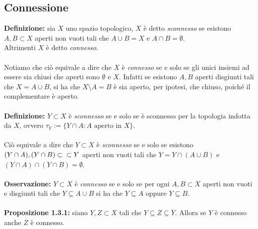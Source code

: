 \documentclass{article}
\begin{document}
\newpage
\subsection{Connessione}
\textbf{Definizione:} sia $X$ uno spazio topologico, $X$ è detto \textit{sconnesso} se esistono $A, B \subset X$ aperti non vuoti tali che $A \cup B = X$ e $A \cap B = \emptyset$. \\ Altrimenti $X$ è detto \textit{connesso}. \\ \\
Notiamo che ciò equivale a dire che $X$ è \textit{connesso} se e solo se gli unici insiemi ad essere sia chiusi che aperti sono $\emptyset$ e $X$. Infatti se esistono $A, B$ aperti disgiunti tali che $X = A \cup B$, si ha che $X \setminus A = B$ è sia aperto, per ipotesi, che chiuso, poiché il complementare è aperto. \\ \\
\textbf{Definizione:} $Y \subset X$ è \textit{sconnesso} se e solo se è sconnesso per la topologia indotta da $X$, ovvero $\tau_Y := \{ Y \cap A : A \text{ aperto in } X \}$. \\ \\
Ciò equivale a dire che $Y \subset X$ è \textit{sconnesso} se e solo se esistono $(Y \cap A), (Y \cap B) \subset\\\subset Y$ aperti non vuoti tali che $Y = Y \cap (A \cup B)$ e $(Y \cap A) \cap (Y \cap B) = \emptyset$. \\ \\
\textbf{Osservazione:} $Y \subset X$ è \textit{connesso} se e solo se per ogni $A, B \subset X$ aperti non vuoti e disgiunti tali che $Y \subseteq A \cup B$ si ha che $Y \subseteq A$ oppure $Y \subseteq B$. \\ \\
\textbf{Proposizione 1.3.1:} siano $Y, Z \subset X$ tali che $Y \subseteq Z \subseteq \overline{Y}$. Allora se $Y$ è connesso anche $Z$ è connesso. \\
\end{document}
